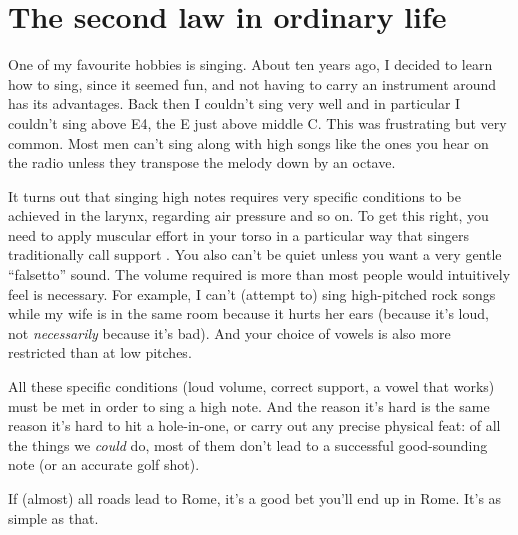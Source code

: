 \documentclass[a4paper, 12pt]{article}
\begin{document}
\section*{The second law in ordinary life}
One of my favourite hobbies is singing. About ten years ago, I decided to
learn how to sing, since it seemed fun, and not having to carry an instrument
around has its advantages. Back then I couldn't sing very well and in particular
I couldn't sing above E4, the E just above middle C. This was frustrating but
very common. Most men can't sing along with high songs like the ones you hear on
the radio unless they transpose the melody down by an octave.

It turns out that singing high notes requires very specific conditions to be
achieved in the larynx, regarding air pressure and so on. To get this right,
you need to apply muscular effort in your torso in a particular way that singers
traditionally call support \citep{cvt}. You also can't be quiet unless you want
a very gentle ``falsetto'' sound. The volume required is more than most people
would intuitively feel is necessary. For example, I can't (attempt to)
sing high-pitched
rock songs while my wife is in the same room because it hurts her ears
(because it's loud, not {\em necessarily} because it's bad). And
your choice of vowels is also more restricted than at low pitches.

All these specific conditions (loud volume, correct support, a vowel that works)
must be met in order to sing a high note. And
the reason it's hard is the same reason it's hard to hit a hole-in-one, or
carry out any precise physical feat: of all the things we {\em could} do,
most of them don't lead to a successful good-sounding note (or an accurate
golf shot).

If (almost) all roads lead to Rome, it's a good bet you'll end up in Rome.
It's as simple as that.
\end{document}
